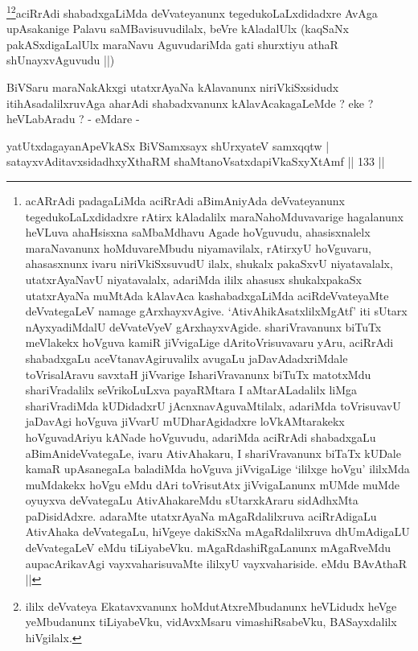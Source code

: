 \begin{artha}
\footnote{acARrAdi padagaLiMda aciRrAdi aBimAniyAda deVvateyanunx
  tegedukoLaLxdidadxre rAtirx kAladalilx maraNahoMduvavarige
  hagalanunx heVLuva ahaHsisxna saMbaMdhavu Agade hoVguvudu,
  ahasisxnalelx maraNavanunx hoMduvareMbudu niyamavilalx, rAtirxyU
  hoVguvaru, ahasasxnunx ivaru niriVkiSxsuvudU ilalx, shukalx pakaSxvU
  niyatavalalx, utatxrAyaNavU niyatavalalx, adariMda ililx ahasusx
  shukalxpakaSx utatxrAyaNa muMtAda kAlavAca kashabadxgaLiMda
  aciRdeVvateyaMte deVvategaLeV namage
  gArxhayxvAgive. `AtivAhikAsatxlilxMgAtf' iti sUtarx nAyxyadiMdalU
  deVvateVyeV gArxhayxvAgide. shariVravanunx biTuTx meVlakekx hoVguva
  kamiR jiVvigaLige dAritoVrisuvavaru yAru, aciRrAdi shabadxgaLu
  aceVtanavAgiruvalilx avugaLu jaDavAdadxriMdale toVrisalAravu savxtaH
  jiVvarige IshariVravanunx biTuTx matotxMdu shariVradalilx
  seVrikoLuLxva payaRMtara I aMtarALadalilx liMga shariVradiMda
  kUDidadxrU jAcnxnavAguvaMtilalx, adariMda toVrisuvavU jaDavAgi
  hoVguva jiVvarU mUDharAgidadxre loVkAMtarakekx hoVguvadAriyu kANade
  hoVguvudu, adariMda aciRrAdi shabadxgaLu aBimAnideVvategaLe, ivaru
  AtivAhakaru, I shariVravanunx biTaTx kUDale kamaR upAsanegaLa
  baladiMda hoVguva jiVvigaLige `ililxge hoVgu' ililxMda muMdakekx
  hoVgu eMdu dAri toVrisutAtx jiVvigaLanunx mUMde muMde oyuyxva
  deVvategaLu AtivAhakareMdu sUtarxkAraru sidAdhxMta
  paDisidAdxre. adaraMte utatxrAyaNa mAgaRdalilxruva aciRrAdigaLu
  AtivAhaka deVvategaLu, hiVgeye dakiSxNa mAgaRdalilxruva dhUmAdigaLU
  deVvategaLeV eMdu tiLiyabeVku. mAgaRdashiRgaLanunx mAgaRveMdu
  aupacArikavAgi vayxvaharisuvaMte ililxyU vayxvahariside. eMdu
  BAvAthaR ||}\footnote{ililx deVvateya Ekatavxvanunx
  hoMdutAtxreMbudanunx heVLidudx heVge yeMbudanunx tiLiyabeVku,
  vidAvxMsaru vimashiRsabeVku, BASayxdalilx hiVgilalx.}aciRrAdi shabadxgaLiMda deVvateyanunx tegedukoLaLxdidadxre
AvAga upAsakanige Palavu saMBavisuvudilalx, beVre kAladalUlx (kaqSaNx
pakASxdigaLalUlx maraNavu AguvudariMda gati shurxtiyu athaR
shUnayxvAguvudu ||)
\end{artha}

\begin{artha}
BiVSaru maraNakAkxgi utatxrAyaNa kAlavanunx niriVkiSxsidudx
itihAsadalilxruvAga aharAdi shabadxvanunx kAlavAcakagaLeMde ? eke ?
heVLabAradu ? - eMdare -
\end{artha}

\begin{shl}
yatUtxdagayanApeVkASx BiVSamxsayx shUrxyateV samxqqtw | \\
satayxvAditavxsidadhxyXthaRM shaMtanoVsatxdapiVkaSxyXtAmf \hfill|| 133 || 
\end{shl}

